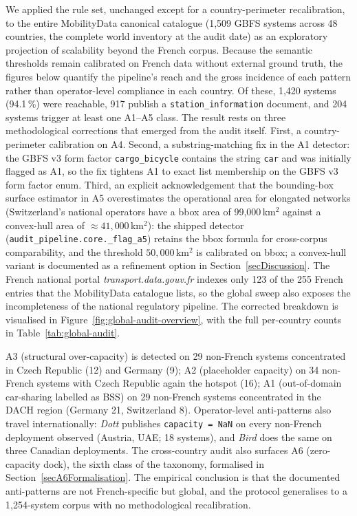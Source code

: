 \documentclass[11pt,a4paper]{article}
\begin{document}
We applied the rule set, unchanged except for a country-perimeter
recalibration, to the entire MobilityData canonical catalogue
(1{,}509 GBFS systems across 48 countries, the complete world inventory at
the audit date) as an exploratory projection of scalability beyond the
French corpus. Because the semantic thresholds remain calibrated on French
data without external ground truth, the figures below quantify the
pipeline's reach and the gross incidence of each pattern rather than
operator-level compliance in each country. Of these, 1{,}420 systems
(94.1\,\%) were reachable, 917 publish a \texttt{station\_information}
document, and 204 systems trigger at least one A1--A5 class. The result
rests on three methodological corrections that emerged from the audit
itself. First, a country-perimeter calibration on A4. Second, a
substring-matching fix in the A1 detector: the GBFS v3 form factor
\texttt{cargo\_bicycle} contains the string \texttt{car} and was
initially flagged as A1, so the fix tightens A1 to exact list
membership on the GBFS v3 form factor enum. Third, an explicit
acknowledgement that the bounding-box surface estimator in A5
overestimates the operational area for elongated networks
(Switzerland's national operators have a bbox area of
99{,}000\,km$^2$ against a convex-hull area of
$\approx 41{,}000$\,km$^2$): the shipped detector
(\texttt{audit\_pipeline.core.\_flag\_a5}) retains the bbox formula
for cross-corpus comparability, and the threshold
$50{,}000$\,km$^2$ is calibrated on bbox; a convex-hull
variant is documented as a refinement option in
Section~\ref{secDiscussion}. The French
national portal \emph{transport.data.gouv.fr} indexes only 123 of
the 255 French entries that the MobilityData catalogue lists, so
the global sweep also exposes the incompleteness of the national
regulatory pipeline. The corrected breakdown is visualised in
Figure~\ref{fig:global-audit-overview}, with the full per-country
counts in Table~\ref{tab:global-audit}.

A3 (structural over-capacity) is detected on 29 non-French systems
concentrated in Czech Republic (12) and Germany (9); A2 (placeholder
capacity) on 34 non-French systems with Czech Republic again the
hotspot (16); A1 (out-of-domain car-sharing labelled as BSS) on 29
non-French systems concentrated in the DACH region (Germany 21,
Switzerland 8). Operator-level anti-patterns also travel
internationally: \emph{Dott} publishes \texttt{capacity = NaN} on
every non-French deployment observed (Austria, UAE; 18 systems),
and \emph{Bird} does the same on three Canadian deployments. The
cross-country audit also surfaces A6 (zero-capacity dock),
the sixth class of the taxonomy, formalised in
Section~\ref{secA6Formalisation}. The empirical conclusion is that
the documented anti-patterns are not French-specific but global,
and the protocol generalises to a 1{,}254-system corpus with no
methodological recalibration.
\end{document}
